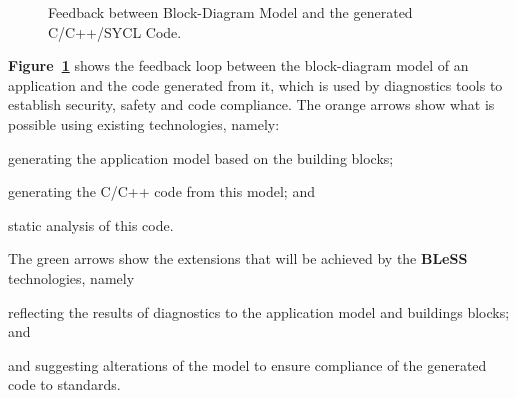 \documentclass[a4paper,11pt]{article}
\newcommand{\project}[1]{\textbf{#1}\xspace}
\newcommand{\BLESS}{\project{BLeSS}}
\newcommand{\TheProject}{\BLESS}
\begin{document}
 \begin{figure}[tp]
 \begin{center}
 \vspace*{-5mm}
 \hspace{-0.2in}
 \end{center}
  \vspace{-2cm}
 \caption{Feedback between Block-Diagram Model and the generated C/C++/SYCL Code.}
 \label{fig:modelling}
 \end{figure}
 
\textbf{ Figure~\ref{fig:modelling}} shows the feedback loop between the block-diagram model of an application and the code generated from it, which is used by diagnostics tools to establish security, safety and code compliance. The orange arrows show what is possible using existing technologies, namely:
\begin{inparaenum}[i)]
\item
generating the application model based on the building blocks;
\item
 generating the C/C++ code from this model; and
\item
static analysis of this code. 
\end{inparaenum}
The green arrows show the extensions that will be achieved by the \TheProject{} technologies, namely
\begin{inparaenum}[i)]
\item
 reflecting the results of diagnostics to the application model and buildings blocks; and
\item
and suggesting alterations of the model to ensure compliance of the generated code to standards.
\end{inparaenum}



\end{document}
